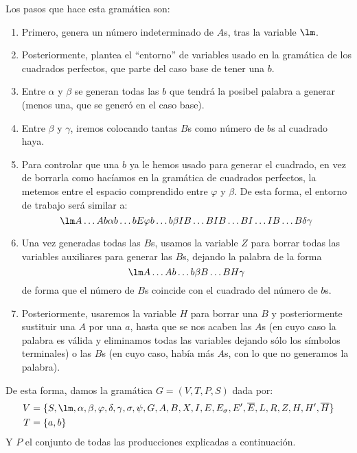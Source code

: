\begin{ejercicio}
\begin{enumerate}
            Los pasos que hace esta gramática son:
            \begin{enumerate}
                \item Primero, genera un número indeterminado de $A$s, tras la variable $\lm$. 
                \item Posteriormente, plantea el ``entorno'' de variables usado en la gramática de los cuadrados perfectos, que parte del caso base de tener una $b$.
                \item Entre $\alpha$ y $\beta$ se generan todas las $b$ que tendrá la posibel palabra a generar (menos una, que se generó en el caso base).
                \item Entre $\beta$ y $\gamma$, iremos colocando tantas $B$s como número de $b$s al cuadrado haya.
                \item Para controlar que una $b$ ya le hemos usado para generar el cuadrado, en vez de borrarla como hacíamos en la gramática de cuadrados perfectos, la metemos entre el espacio comprendido entre $\varphi$ y $\beta$. De esta forma, el entorno de trabajo será similar a:
                    \begin{equation*}
                        \lm A\ldots A b\alpha b\ldots b E\varphi b\ldots b \beta I B\ldots B I B \ldots BI \ldots I B \ldots B \delta\gamma
                    \end{equation*}
                \item Una vez generadas todas las $B$s, usamos la variable $Z$ para borrar todas las variables auxiliares para generar las $B$s, dejando la palabra de la forma
                    \begin{equation*}
                        \lm A \ldots A b\ldots b \beta B\ldots BH\gamma
                    \end{equation*}
                    de forma que el número de $B$s coincide con el cuadrado del número de $b$s.
                \item Posteriormente, usaremos la variable $H$ para borrar una $B$ y posteriormente sustituir una $A$ por una $a$, hasta que se nos acaben las $A$s (en cuyo caso la palabra es válida y eliminamos todas las variables dejando sólo los símbolos terminales) o las $B$s (en cuyo caso, había más $A$s, con lo que no generamos la palabra).
            \end{enumerate}

            De esta forma, damos la gramática $G=(V,T,P,S)$ dada por:
            \begin{align*}
                V &= \{S, \lm, \alpha,\beta,\varphi, \delta,\gamma, \sigma, \psi, G, A, B, X, I, E, E_{\sigma}, E', \overline{E}, L, R, Z, H, H', \overline{H}\} \\
                T &= \{a,b\}
            \end{align*}
            Y $P$ el conjunto de todas las producciones explicadas a continuación.


\end{enumerate}
\end{ejercicio}
